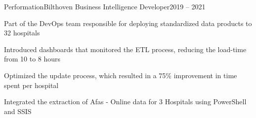\resumeSubheading
  {Performation}{Bilthoven}
  {Business Intelligence Developer}{2019 – 2021}
  \vspace{\experienceItemSpacing}
  \resumeItemListStart
\item Part of the DevOps team responsible for deploying standardized data products to 32 hospitals
\item Introduced dashboards that monitored the ETL process, reducing the load-time from 10 to 8 hours
\item Optimized the update process, which resulted in a 75\% improvement in time spent per hospital
\item Integrated the extraction of Afas - Online data for 3 Hospitals using PowerShell and SSIS
  \resumeItemListEnd 